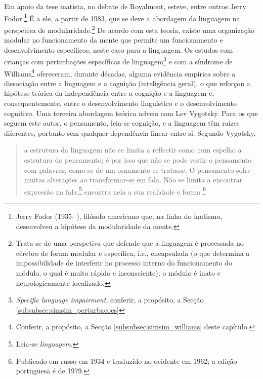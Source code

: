 \documentclass[output=paper]{LSP/langsci}
\begin{document}
Em apoio da tese inatista, no debate de Royalmont, esteve, entre outros Jerry Fodor.\footnote{Jerry Fodor (1935- ), filósofo americano que, na linha do inatismo, desenvolveu a hipótese da modularidade da mente.} É a ele, a partir de 1983, que se deve a abordagem da linguagem na perspetiva de modularidade.\footnote{Trata-se de uma perspetiva que defende que a linguagem é processada no cérebro de forma modular e específica, i.e., encapsulada (o que determina a impossibilidade de interferir no processo interno do funcionamento do módulo, o qual é muito rápido e inconsciente); o módulo é inato e neurologicamente localizado.\label{ftn:simsim_rodape_27}} De acordo com esta teoria, existe uma organização modular no funcionamento da mente que permite um funcionamento e desenvolvimento específicos, neste caso para a linguagem. Os estudos com crianças com perturbações específicas de linguagem\footnote{\emph{Specific language impairment}, conferir, a propósito, a Secção \ref{subsubsec:simsim_perturbacoes}} e com a síndrome de Williams\footnote{Conferir, a propósito, a Secção \ref{subsubsec:simsim_williams} deste capítulo.} ofereceram, durante décadas, alguma evidência empírica sobre a dissociação entre a linguagem e a cognição (inteligência geral), o que reforçou a hipótese teórica da independência entre a cognição e a linguagem e, consequentemente, entre o desenvolvimento linguístico e o desenvolvimento cognitivo. Uma terceira abordagem teórica adveio com Lev Vygotsky. Para os que seguem este autor, o pensamento, leia-se cognição, e a linguagem têm raízes diferentes, portanto sem qualquer dependência linear entre si. Segundo Vygotsky, 

\begin{quote}
a estrutura da linguagem não se limita a reflectir como num espelho a estrutura do pensamento; é por isso que não se pode vestir o pensamento com palavras, como se de um ornamento se tratasse. O pensamento sofre muitas alterações ao transformar-se em fala. Não se limita a encontrar expressão na fala;\footnote{Leia-se \emph{linguagem}.} encontra nela a sua realidade e forma \citep[166]{vygotsky1979}\footnote{Publicado em russo em 1934 e traduzido no ocidente em 1962; a edição portuguesa é de 1979.}
\end{quote}
\end{document}
